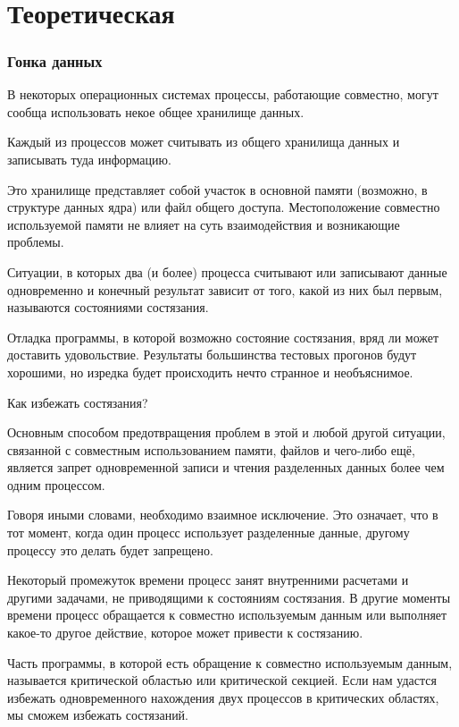\documentclass[a4paper,12pt]{extarticle}
\begin{document}

\newpage

\tableofcontents
\newpage
\
\part{Теоретическая}

\section{Гонка данных}
В некоторых операционных системах процессы, работающие совместно, могут сообща использовать некое общее хранилище данных.

Каждый из процессов может считывать из общего хранилища данных и записывать туда информацию.

Это хранилище представляет собой участок в основной памяти (возможно, в структуре данных ядра) или файл общего доступа. Местоположение совместно используемой памяти не влияет на суть взаимодействия и возникающие проблемы.

Ситуации, в которых два (и более) процесса считывают или записывают данные одновременно и конечный результат зависит от того, какой из них был первым, называются состояниями состязания.

Отладка программы, в которой возможно состояние состязания, вряд ли может доставить удовольствие. Результаты большинства тестовых прогонов будут хорошими, но изредка будет происходить нечто странное и необъяснимое.

Как избежать состязания?

Основным способом предотвращения проблем в этой и любой другой ситуации, связанной с совместным использованием памяти, файлов и чего-либо ещё, является запрет одновременной записи и чтения разделенных данных более чем одним процессом.

Говоря иными словами, необходимо взаимное исключение. Это означает, что в тот момент, когда один процесс использует разделенные данные, другому процессу это делать будет запрещено.

Некоторый промежуток времени процесс занят внутренними расчетами и другими задачами, не приводящими к состояниям состязания. В другие моменты времени процесс обращается к совместно используемым данным или выполняет какое-то другое действие, которое может привести к состязанию.

Часть программы, в которой есть обращение к совместно используемым данным, называется критической областью или критической секцией. Если нам удастся избежать одновременного нахождения двух процессов в критических областях, мы сможем избежать состязаний.
\end{document}
